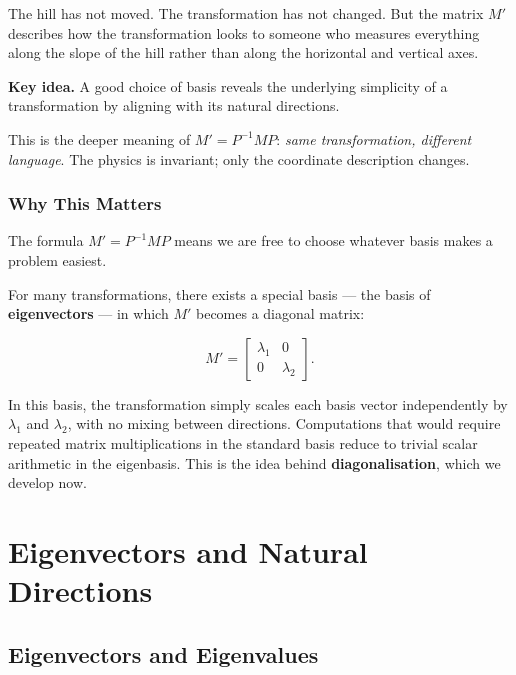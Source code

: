 \documentclass[11pt,openany]{book}
\theoremstyle{definition}
\begin{document}
\medskip

The hill has not moved. The transformation has not changed. But the matrix $M'$ 
describes how the transformation looks to someone who measures everything along the 
slope of the hill rather than along the horizontal and vertical axes.

\medskip

\textbf{Key idea.} A good choice of basis reveals the underlying simplicity of a 
transformation by aligning with its natural directions.

\medskip

This is the deeper meaning of $M' = P^{-1}MP$: \textit{same transformation, different 
language}. The physics is invariant; only the coordinate description changes.

\subsection{Why This Matters}

The formula $M' = P^{-1}MP$ means we are free to 
choose whatever basis makes a problem easiest.

\medskip


For many transformations, there exists a special basis --- the basis of 
\textbf{eigenvectors} --- in which $M'$ becomes a diagonal matrix:

\[
M' = \begin{bmatrix} \lambda_1 & 0 \\ 0 & \lambda_2 \end{bmatrix}.
\]

In this basis, the transformation simply scales each basis vector independently by 
$\lambda_1$ and $\lambda_2$, with no mixing between directions. Computations that 
would require repeated matrix multiplications in the standard basis reduce to 
trivial scalar arithmetic in the eigenbasis. This is the idea behind 
\textbf{diagonalisation}, which we develop now.

\chapter{Eigenvectors and Natural Directions}

\section{Eigenvectors and Eigenvalues}
\end{document}

